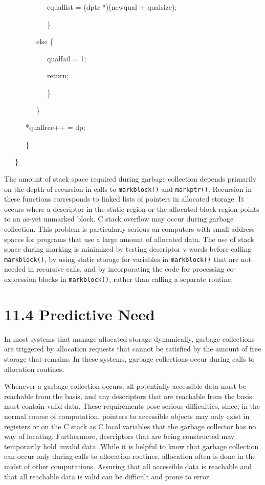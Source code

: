{\ttfamily\mdseries
\ \ \ \ \ \ \ \ \ \ \ \ equallist = (dptr *)(newqual + qualsize);}

{\ttfamily\mdseries
\ \ \ \ \ \ \ \ \ \ \ \ \}
}

{\ttfamily\mdseries
\ \ \ \ \ \ \ \ \ else \{
}

{\ttfamily\mdseries
\ \ \ \ \ \ \ \ \ \ \ \ qualfail = 1;
}

{\ttfamily\mdseries
\ \ \ \ \ \ \ \ \ \ \ \ return;
}

{\ttfamily\mdseries
\ \ \ \ \ \ \ \ \ \ \ \ \}
}

{\ttfamily\mdseries
\ \ \ \ \ \ \ \ \ \}}

{\ttfamily\mdseries
\ \ \ \ \ \ *qualfree++ = dp;}

{\ttfamily\mdseries
\ \ \ \ \ \ \}}

{\ttfamily\mdseries
\ \ \ \}}

The amount of stack space required during garbage collection depends
primarily on the depth of recursion in calls to \texttt{markblock()}
and \texttt{markptr()}. Recursion in these functions corresponds to
linked lists of pointers in allocated storage. It occurs where a
descriptor in the static region or the allocated block region points
to an as-yet unmarked block. C stack overflow may occur during garbage
collection. This problem is particularly serious on computers with
small address spaces for programs that use a large amount of allocated
data. The use of stack space during marking is minimized by testing
descriptor v-words before calling \texttt{markblock()}, by using
static storage for variables in \texttt{markblock()} that are not
needed in recursive calls, and by incorporating the code for
processing co-expression blocks in \texttt{markblock()}, rather than
calling a separate routine.

\section[11.4 Predictive Need]{11.4 Predictive Need}

In most systems that manage allocated storage dynamically, garbage
collections are triggered by allocation requests that cannot be
satisfied by the amount of free storage that remains. In these
systems, garbage collections occur during calls to allocation routines.

Whenever a garbage collection occurs, all potentially accessible data
must be reachable from the basis, and any descriptors that are
reachable from the basis must contain valid data. These requirements
pose serious difficulties, since, in the normal course of computation,
pointers to accessible objects may only exist in registers or on the C
stack as C local variables that the garbage collector has no way of
locating. Furthermore, descriptors that are being constructed may
temporarily hold invalid data. While it is helpful to know that
garbage collection can occur only during calls to allocation routines,
allocation often is done in the midst of other computations. Assuring
that all accessible data is reachable and that all reachable data is
valid can be difficult and prone to error.

